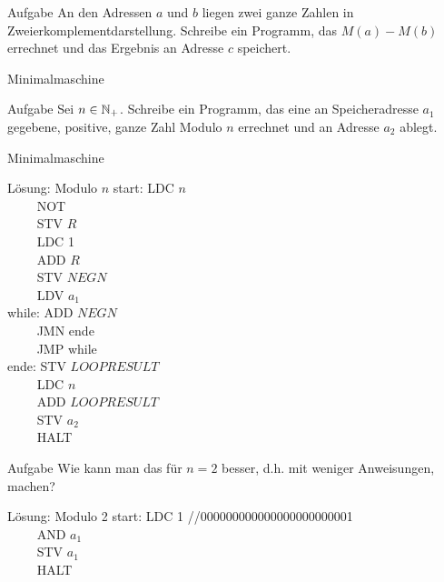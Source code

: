 \begin{frame}{}
	\begin{exampleblock}{Aufgabe}
		An den Adressen $a$ und $b$ liegen zwei ganze Zahlen in Zweierkomplementdarstellung. Schreibe ein Programm, das $M(a)-M(b)$ errechnet und das Ergebnis an Adresse $c$ speichert.
	\end{exampleblock}

\end{frame}

\begin{frame}{Minimalmaschine}
	\begin{exampleblock}{Aufgabe}
		Sei $n \in \mathbb{N}_+$. Schreibe ein Programm, das eine an Speicheradresse $a_1$ gegebene, positive, ganze Zahl Modulo $n$ errechnet und an Adresse $a_2$ ablegt.
	\end{exampleblock}
\end{frame}

\begin{frame}{Minimalmaschine}
	\begin{block}{Lösung: Modulo $n$}\small
		start: LDC $n$\\
		$\qquad$ NOT\\
		$\qquad$ STV $R$\\
		$\qquad$ LDC 1\\
		$\qquad$ ADD $R$\\
		$\qquad$ STV $NEGN$\\
		$\qquad$ LDV $a_1$ \\
		\medskip
		while:   ADD $NEGN$\\
		$\qquad$ JMN ende\\
		$\qquad$ JMP while\\
		\medskip
		ende:    STV $LOOPRESULT$\\
		$\qquad$ LDC $n$\\
		$\qquad$ ADD $LOOPRESULT$\\
		$\qquad$ STV $a_2$\\
		$\qquad$ HALT\\
	\end{block}
\end{frame}

\begin{frame}{}
	\begin{exampleblock}{Aufgabe}
		Wie kann man das für $n=2$ besser, d.h. mit weniger Anweisungen, machen?
	\end{exampleblock}
\pause
	\begin{block}{Lösung: Modulo 2}
		start:   LDC 1 //000000000000000000000001 \\
		$\qquad$ AND $a_1$ \\
		$\qquad$ STV $a_1$ \\
		$\qquad$ HALT
	\end{block}
\end{frame}



\section{}
\questionframe
\lastframe
{}
